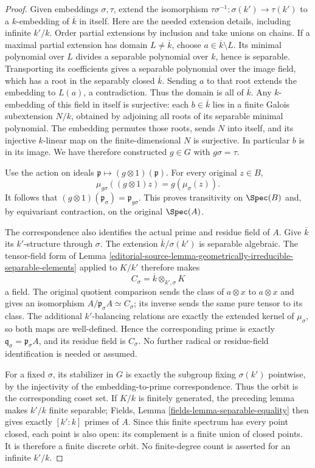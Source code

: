 \begin{proof}
Given embeddings $\sigma,\tau$,
extend the isomorphism
$\tau\sigma^{-1}:\sigma(k')\to\tau(k')$
to a $k$-embedding of $\overline k$
in itself. Here are the needed
extension details, including
infinite $k'/k$. Order partial
extensions by inclusion and
take unions on chains. If a
maximal partial extension has
domain $L\neq\overline k$, choose
$a\in\overline k\setminus L$.
Its minimal polynomial over
$L$ divides a separable
polynomial over $k$, hence is
separable. Transporting its
coefficients gives a separable
polynomial over the image field,
which has a root in the
separably closed $\overline k$.
Sending $a$ to that root extends
the embedding to $L(a)$, a
contradiction. Thus the domain
is all of $\overline k$.
Any $k$-embedding of this field
in itself is surjective: each
$b\in\overline k$ lies in a
finite Galois subextension $N/k$,
obtained by adjoining all roots
of its separable minimal polynomial.
The embedding permutes those
roots, sends $N$ into itself,
and its injective $k$-linear
map on the finite-dimensional
$N$ is surjective. In particular
$b$ is in its image. We have
therefore constructed $g\in G$
with $g\sigma=\tau$.

Use the action on ideals
$\mathfrak p\mapsto(g\otimes1)(\mathfrak p)$.
For every original $z\in B$,
$$
\mu_{g\sigma}((g\otimes1)z)=g(\mu_\sigma(z)).
$$
It follows that
$(g\otimes1)(\mathfrak p_\sigma)=\mathfrak p_{g\sigma}$.
This proves transitivity on
$\Spec(B)$ and, by equivariant
contraction, on the original
$\Spec(A)$.

The correspondence also identifies
the actual prime and residue
field of $A$. Give $\overline k$
its $k'$-structure through
$\sigma$. The extension
$\overline k/\sigma(k')$ is
separable algebraic. The tensor-field
form of Lemma
\ref{editorial-source-lemma-geometrically-irreducible-separable-elements}
applied to $K/k'$ therefore makes
$$
C_\sigma=\overline k\otimes_{k',\sigma}K
$$
a field. The original quotient
comparison sends the class of
$a\otimes x$ to $a\otimes x$
and gives an isomorphism
$A/\mathfrak p_\sigma A\simeq C_\sigma$;
its inverse sends the same pure
tensor to its class. The additional
$k'$-balancing relations are
exactly the extended kernel
of $\mu_\sigma$, so both maps
are well-defined. Hence the
corresponding prime is exactly
$\mathfrak q_\sigma=\mathfrak p_\sigma A$,
and its residue field is
$C_\sigma$. No further radical
or residue-field identification
is needed or assumed.

For a fixed $\sigma$, its
stabilizer in $G$ is exactly
the subgroup fixing $\sigma(k')$
pointwise, by the injectivity
of the embedding-to-prime
correspondence. Thus the orbit
is the corresponding coset
set. If $K/k$ is finitely
generated, the preceding lemma
makes $k'/k$ finite separable;
Fields, Lemma
\ref{fields-lemma-separable-equality}
then gives exactly $[k':k]$
primes of $A$. Since this
finite spectrum has every
point closed, each point is
also open: its complement is
a finite union of closed
points. It is therefore a
finite discrete orbit. No
finite-degree count is asserted
for an infinite $k'/k$.
\end{proof}